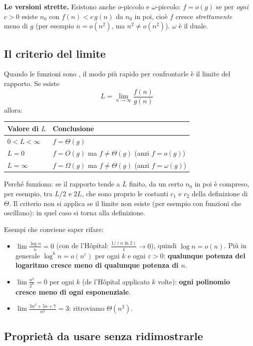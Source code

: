 \textbf{Le versioni strette.} Esistono anche $o$-piccolo e $\omega$-piccolo:
$f = o(g)$ se per \emph{ogni} $c > 0$ esiste $n_0$ con $f(n) < c\,g(n)$ da $n_0$ in
poi, cioè $f$ cresce \emph{strettamente} meno di $g$ (per esempio $n = o(n^2)$, ma
$n^2 \neq o(n^2)$). $\omega$ è il duale.

\subsection*{Il criterio del limite}

Quando le funzioni sono , il modo più rapido per confrontarle è il limite
del rapporto. Se esiste
\[
L = \lim_{n \to \infty} \frac{f(n)}{g(n)}
\]
allora:
\begin{center}
\begin{tabular}{ll}
\toprule
\textbf{Valore di $L$} & \textbf{Conclusione} \\
\midrule
$0 < L < \infty$ & $f = \Theta(g)$ \\
$L = 0$ & $f = O(g)$ ma $f \neq \Theta(g)$ (anzi $f = o(g)$) \\
$L = \infty$ & $f = \Omega(g)$ ma $f \neq \Theta(g)$ (anzi $f = \omega(g)$) \\
\bottomrule
\end{tabular}
\end{center}
Perché funziona: se il rapporto tende a $L$ finito, da un certo $n_0$ in poi è
compreso, per esempio, tra $L/2$ e $2L$, che sono proprio le costanti $c_1$ e $c_2$
della definizione di $\Theta$. Il criterio non si applica se il limite non esiste
(per esempio con funzioni che oscillano): in quel caso si torna alla definizione.

Esempi che conviene saper rifare:
\begin{itemize}
  \item $\lim \frac{\log n}{n} = 0$ (con de l'Hôpital: $\frac{1/(n \ln 2)}{1} \to 0$),
        quindi $\log n = o(n)$. Più in generale $\log^k n = o(n^\varepsilon)$ per ogni
        $k$ e ogni $\varepsilon > 0$: \textbf{qualunque potenza del logaritmo cresce meno
        di qualunque potenza di $n$}.
  \item $\lim \frac{n^k}{2^n} = 0$ per ogni $k$ (de l'Hôpital applicato $k$ volte):
        \textbf{ogni polinomio cresce meno di ogni esponenziale}.
  \item $\lim \frac{3n^2 + 5n + 7}{n^2} = 3$: ritroviamo $\Theta(n^2)$.
\end{itemize}

\subsection*{Proprietà da usare senza ridimostrarle}

